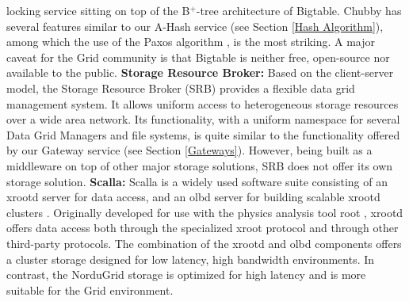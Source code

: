 \documentclass[final]{ieee}
\begin{document}
locking service sitting on top of the B$^+$-tree architecture of
Bigtable. Chubby has several features similar to our A-Hash service (see Section \ref{Hash Algorithm}),
among which the use of the Paxos algorithm \cite{Paxos,PaxosLive}, is
the most striking. A major caveat for the Grid community is that
Bigtable is neither free, open-source nor available to the public.
\newline
\textbf{Storage Resource Broker:}  Based on the client-server model,
the Storage Resource Broker (SRB) \cite{earlySRB,SRB} provides a flexible data grid management
system. It allows  uniform access to heterogeneous
storage resources over a wide area network. %
Its functionality, with a uniform namespace for several Data Grid
Managers and file systems, is quite similar to the functionality
offered by our Gateway service (see Section \ref{Gateways}). However, being built as a middleware on top of
other major storage solutions, SRB does not offer its own storage solution.
\newline
\textbf{Scalla:} Scalla is a widely used software suite consisting of an
xrootd server for data access, and an olbd
server for building scalable xrootd clusters \cite{Scalla}. %
Originally developed for use with the physics analysis tool root \cite{root},
xrootd offers data access both through the specialized xroot protocol
and through other third-party protocols. The combination of the xrootd
and olbd components offers a cluster storage designed for low latency,
high bandwidth environments. In contrast, the NorduGrid storage is optimized
for high latency and is more suitable for the Grid environment.
\end{document}
